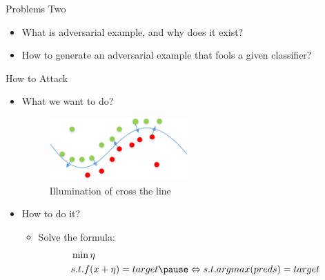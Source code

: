 \documentclass[
 size=12pt,
 paper=smartboard, %
 mode=present, %
 display=slides, %
style=tuliplab,
pauseslide,
fleqn,leqno]{powerdot}
\begin{document}
\begin{slide}{Problems Two}
  \begin{itemize}
    \item What is adversarial example, and why does it exist?
    \item How to generate an adversarial example that fools a given classifier?
  \end{itemize}
\end{slide}

\begin{slide}{How to Attack}
  \begin{itemize}
    \item What we want to do? \pause
    \begin{figure}[h]
      \centering
      \includegraphics[width=0.5\textwidth]{figures3/wannado.eps}
      \caption{Illumination of cross the line}
      \label{fig:illumination-of-wannado}
    \end{figure} \pause
    \item How to do it? \pause
    \begin{itemize}
      \item Solve the formula:
      \begin{equation}
        \begin{split}
        &\min{\eta} \\
        &s.t. f(x+\eta) = target \pause \Leftrightarrow s.t. argmax(preds) = target
        \end{split}
      \end{equation} \pause
      
    \end{itemize}
  \end{itemize}
\end{slide}
\end{document}
